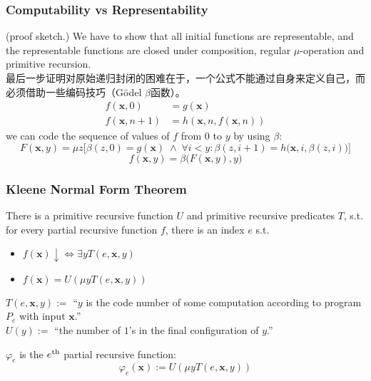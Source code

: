 \documentclass[UTF8,aspectratio=43,11pt,colorlinks,compress,openany]{beamer}%
\begin{document}
\begin{frame}\frametitle{Computability vs Representability}
\begin{center}
\end{center}
(proof sketch.) We have to show that all initial functions are representable, and the representable functions are closed under composition, regular $\mu$-operation and primitive recursion.\\
最后一步证明对原始递归封闭的困难在于，一个公式不能通过自身来定义自己，而必须借助一些编码技巧（G\"odel $\beta$函数）。
		\begin{align*}
		f(\mathbf{x},0)&=g(\mathbf{x})\\
		f(\mathbf{x},n+1)&=h\left(\mathbf{x},n,f(\mathbf{x},n)\right)
		\end{align*}
we can code the sequence of values of $f$ from $0$ to $y$ by using $\beta$:
\[F(\mathbf{x},y)=\mu z\big[\beta(z,0)=g(\mathbf{x})\;\wedge\;\forall i<y:\beta(z,i+1)=h\big(\mathbf{x},i,\beta(z,i)\big)\big]\]
\[f(\mathbf{x},y)=\beta\big(F(\mathbf{x},y),y\big)\]
\end{frame}

\begin{frame}\frametitle{Kleene Normal Form Theorem}
	\begin{theorem}
		There is a primitive recursive function $U$ and primitive recursive predicates $T$, s.t. for every partial recursive function $f$, there is an index $e$ s.t.
		\begin{itemize}
			\item $f(\mathbf{x})\!\downarrow\iff\exists y T(e,\mathbf{x},y)$
			\item $f(\mathbf{x})=U(\mu y T(e,\mathbf{x},y))$
		\end{itemize}
	\end{theorem}
	\begin{block}{}
		$T(e,\mathbf{x}, y):=$ ``$y$ is the code	number of some computation according to program $P_e$ with input $\mathbf{x}$.''\\
		$U(y):=$ ``the number of $1$'s in the final configuration of $y$.''
	\end{block}
	\begin{definition}
		$\varphi_e$ is the $e\textsuperscript{th}$ partial recursive function:
		\[\varphi_e(\mathbf{x}):=U(\mu y T(e,\mathbf{x},y))\]
	\end{definition}
\end{frame}
\end{document}
